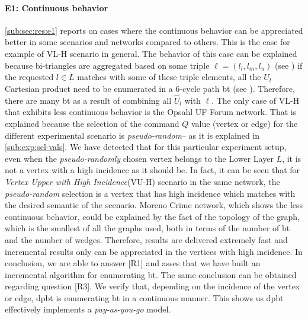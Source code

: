 \paragraph{E1: Continuous behavior} \autoref{sub:sec:res:e1} reports on cases where the continuous behavior can be appreciated better in some scenarios and networks compared to others. This is the case for example of VL-H scenario in general. 
The behavior of this case can be explained because bi-triangles are aggregated based on some triple $\ell = (l_l,l_m,l_u)$ (see ) if the requested $l \in L$ matches with some of these triple elements, all the $\hat{U}_l$ Cartesian product need to be enumerated in a 6-cycle path \acrshort{bt} (see ). Therefore, there are many \acrshort{bt} as a result of combining all $\hat{U}_l$ with $\ell$.
The only case of VL-H that exhibits less continuous behavior is the Opsahl UF Forum network. That is explained because the selection of the command $Q$ value (vertex or edge) for the different experimental scenario is \emph{pseudo-random}-- as it is explained in \autoref{sub:exp:sel-vals}. 
We have detected that for this particular experiment setup, even when the \emph{pseudo-randomly} chosen vertex belongs to the Lower Layer $L$, it is not a vertex with a high incidence as it should be.
In fact, it can be seen that for \emph{Vertex Upper with High Incidence}(VU-H) scenario in the same network, the \emph{pseudo-random} selection is a vertex that has high incidence which matches with the desired semantic of the scenario. 
Moreno Crime network, which shows the less continuous behavior, could be explained by the fact of the topology of the graph, which is the smallest of all the graphs used, both in terms of the number of \acrshort{bt} and the number of wedges.
Therefore, results are delivered extremely fast and incremental results only can be appreciated in the vertices with high incidence.
In conclusion, we are able to answer [R1] and asses that we have built an incremental algorithm for enumerating \acrlong{bt}. 
The same conclusion can be obtained regarding question [R3]. We verify that, depending on the incidence of the vertex or edge, \acrshort{dpbt} is enumerating \acrshort{bt} in a continuous manner. This shows us \acrshort{dpbt} effectively implements a \emph{pay-as-you-go} model.

